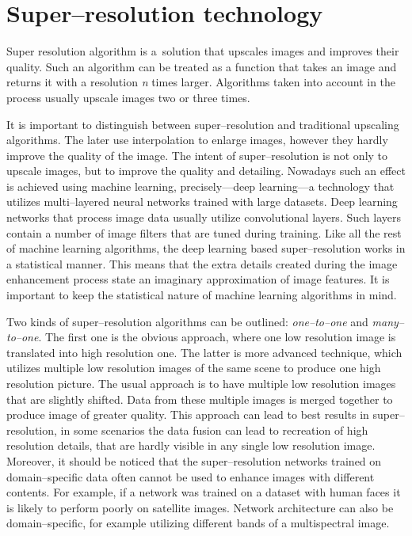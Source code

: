 \section{Super--resolution technology}
Super resolution algorithm is a~solution that upscales images and improves
their quality.
Such an algorithm can be treated as a function that takes an image and returns
it with a resolution \textit{n} times larger.
Algorithms taken into account in the process usually upscale images two or
three times.

It is important to distinguish between super--resolution and traditional
upscaling algorithms.
The later use interpolation to enlarge images, however they hardly improve the
quality of the image.
The intent of super--resolution is not only to upscale images, but to improve
the quality and detailing.
Nowadays such an effect is achieved using machine learning, precisely---deep
learning---a technology that utilizes multi--layered neural networks trained
with large datasets.
Deep learning networks that process image data usually utilize convolutional
layers.
Such layers contain a number of image filters that are tuned during training.
Like all the rest of machine learning algorithms, the deep learning based
super--resolution works in a statistical manner.
This means that the extra details created during the image enhancement process
state an imaginary approximation of image features.
It is important to keep the statistical nature of machine learning algorithms
in mind.

Two kinds of super--resolution algorithms can be outlined:
\textit{one--to--one} and \textit{many--to--one}.
The first one is the obvious approach, where one low resolution image is
translated into high resolution one.
The latter is more advanced technique, which utilizes multiple low resolution
images of the same scene to produce one high resolution picture.
The usual approach is to have multiple low resolution images that are slightly
shifted.
Data from these multiple images is merged together to produce image of greater
quality.
This approach can lead to best results in super--resolution, in some scenarios
the data fusion can lead to recreation of high resolution details, that are
hardly visible in any single low resolution image.
Moreover, it should be noticed that the super--resolution networks trained on
domain--specific data often cannot be used to enhance images with different
contents.
For example, if a network was trained on a dataset with human faces it is
likely to perform poorly on satellite images.
Network architecture can also be domain--specific, for example utilizing
different bands of a multispectral image.

